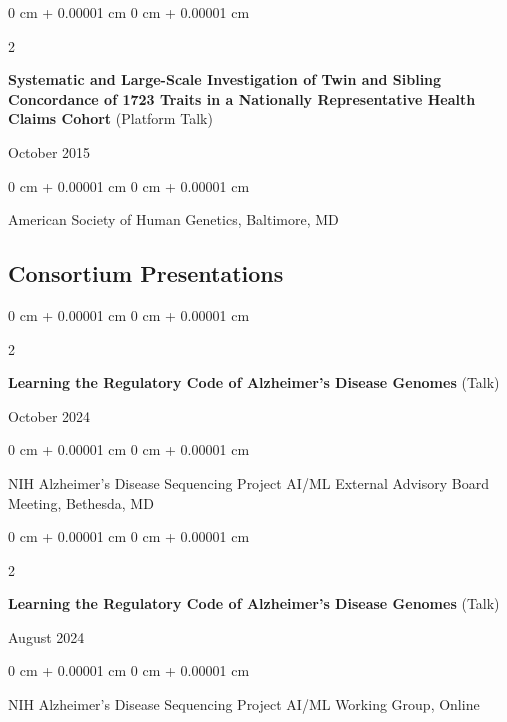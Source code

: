 \documentclass[10pt, letterpaper]{article}
\newenvironment{onecolentry}{
    \begin{adjustwidth}{
        0 cm + 0.00001 cm
    }{
        0 cm + 0.00001 cm
    }
}{
    \end{adjustwidth}
} %
\newenvironment{twocolentry}[2][]{
    \onecolentry
    \def\secondColumn{#2}
    \setcolumnwidth{\fill, 4.5 cm}
    \begin{paracol}{2}
}{
    \switchcolumn \raggedleft \secondColumn
    \end{paracol}
    \endonecolentry
} %
\begin{document}
    \vspace{0.20 cm}

    \begin{samepage}
        \begin{twocolentry}{
            October 2015
        }
            \textbf{Systematic and Large-Scale Investigation of Twin and Sibling Concordance of 1723 Traits in a Nationally Representative Health Claims Cohort} (Platform Talk)
        \end{twocolentry}

        \vspace{0.10 cm}

        \begin{onecolentry}
            American Society of Human Genetics, Baltimore, MD
        \end{onecolentry}
    \end{samepage}

    \vspace{0.20 cm}

\subsection{Consortium Presentations}

    \begin{samepage}
        \begin{twocolentry}{
            October 2024
        }
            \textbf{Learning the Regulatory Code of Alzheimer's Disease Genomes} (Talk)
        \end{twocolentry}

        \vspace{0.10 cm}

        \begin{onecolentry}
            NIH Alzheimer's Disease Sequencing Project AI/ML External Advisory Board Meeting, Bethesda, MD
        \end{onecolentry}
    \end{samepage}

    \vspace{0.20 cm}

    \begin{samepage}
        \begin{twocolentry}{
            August 2024
        }
            \textbf{Learning the Regulatory Code of Alzheimer's Disease Genomes} (Talk)
        \end{twocolentry}

        \vspace{0.10 cm}

        \begin{onecolentry}
            NIH Alzheimer's Disease Sequencing Project AI/ML Working Group, Online
        \end{onecolentry}
    \end{samepage}
\end{document}
